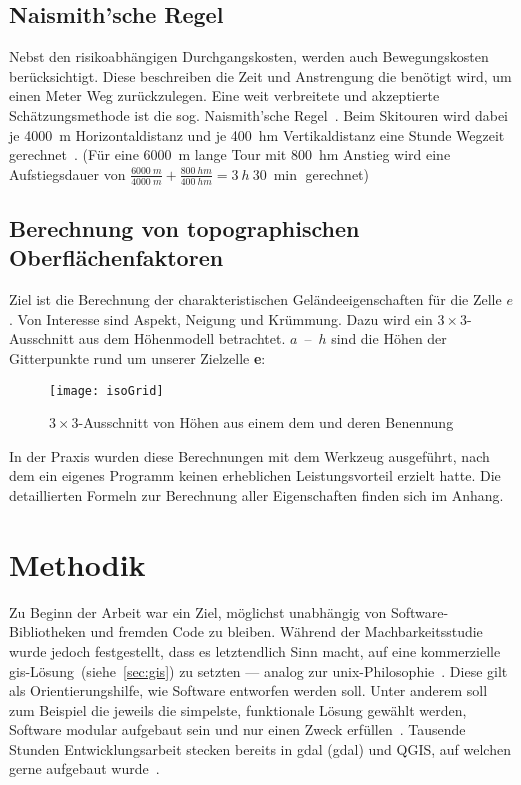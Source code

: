 \subsection{Naismith'sche Regel}

Nebst den risikoabhängigen Durchgangskosten, werden auch Bewegungskosten berücksichtigt. Diese beschreiben die Zeit und Anstrengung die benötigt wird, um einen Meter Weg zurückzulegen. Eine weit verbreitete und akzeptierte Schätzungsmethode ist die sog. Naismith'sche Regel~\cite{naismithsrule}.
Beim Skitouren wird dabei je \qty{4000}{m} Horizontaldistanz und je \qty{400}{hm} Vertikaldistanz eine Stunde Wegzeit gerechnet~\cite{sacbergspwinter}\cite{naismithsrule}. (Für eine \qty{6000}{m} lange Tour mit \qty{800}{hm} Anstieg wird eine Aufstiegsdauer von $\frac{\qty{6000}{m}}{\qty{4000}{m}} + \frac{\qty{800}{hm}}{\qty{400}{hm}} = \qty{3}{h}\ \qty{30}{\min}$ gerechnet)

\clearpage
\subsection{Berechnung von topographischen Oberflächenfaktoren}
Ziel ist die Berechnung der charakteristischen Geländeeigenschaften für die Zelle $e$.
Von Interesse sind Aspekt, Neigung und Krümmung.
Dazu wird ein $3 \times 3$-Ausschnitt aus dem Höhenmodell betrachtet. 
$a$~--~$h$ sind die Höhen der Gitterpunkte rund um unserer Zielzelle \textbf{e}:

\begin{figure}[H]
  \centering
  \texttt{[image: isoGrid]}
  \caption{$3 \times 3$-Ausschnitt von Höhen aus einem \acrshort{dem} und deren Benennung}
\end{figure}

In der Praxis wurden diese Berechnungen mit dem Werkzeug  ausgeführt, nach dem ein eigenes Programm keinen erheblichen Leistungsvorteil erzielt hatte. Die detaillierten Formeln zur Berechnung aller Eigenschaften finden sich im Anhang.


\vfill

\pagebreak


\section{Methodik}

Zu Beginn der Arbeit war ein Ziel, möglichst unabhängig von Software-Bibliotheken und fremden Code zu bleiben. Während der Machbarkeitsstudie wurde jedoch festgestellt, dass es letztendlich Sinn macht, auf eine kommerzielle \gls{gis}-Lösung~(siehe~\ref{sec:gis}) zu setzten --- analog zur \acrshort{unix}-Philosophie~\cite{unixphil}. Diese gilt als Orientierungshilfe, wie Software entworfen werden soll. Unter anderem soll zum Beispiel die jeweils die simpelste, funktionale Lösung gewählt werden, Software modular aufgebaut sein und nur einen Zweck erfüllen~\cite{unixphil}. Tausende Stunden Entwicklungsarbeit stecken bereits in \acrshort{gdal} (\acrlong{gdal}) und QGIS, auf welchen gerne aufgebaut wurde~\cite{gdalmanual}\cite{qgis}.
